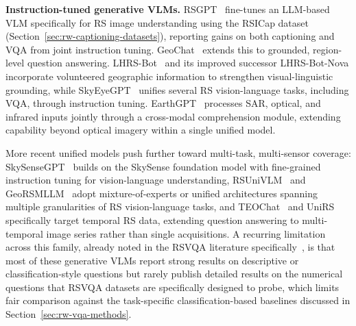 \textbf{Instruction-tuned generative VLMs.} RSGPT~\cite{hu2023rsgpt} fine-tunes an LLM-based VLM specifically for RS image understanding using the RSICap dataset (Section~\ref{sec:rw-captioning-datasets}), reporting gains on both captioning and VQA from joint instruction tuning. GeoChat~\cite{kuckreja2024geochat} extends this to grounded, region-level question answering. LHRS-Bot~\cite{muhtar2025lhrsbot} and its improved successor LHRS-Bot-Nova incorporate volunteered geographic information to strengthen visual-linguistic grounding, while SkyEyeGPT~\cite{zhan2025skyeyegpt} unifies several RS vision-language tasks, including VQA, through instruction tuning. EarthGPT~\cite{zhang2024earthgpt} processes SAR, optical, and infrared inputs jointly through a cross-modal comprehension module, extending capability beyond optical imagery within a single unified model.

More recent unified models push further toward multi-task, multi-sensor coverage: SkySenseGPT~\cite{luo2024skysensegptfinegrainedinstructiontuning} builds on the SkySense foundation model with fine-grained instruction tuning for vision-language understanding, RSUniVLM~\cite{liu2024rsunivlmunifiedvisionlanguage} and GeoRSMLLM~\cite{zhang2025georsmllmmultimodallargelanguage} adopt mixture-of-experts or unified architectures spanning multiple granularities of RS vision-language tasks, and TEOChat~\cite{irvin2025teochatlargevisionlanguageassistant} and UniRS~\cite{li2024unirsunifyingmultitemporalremote} specifically target temporal RS data, extending question answering to multi-temporal image series rather than single acquisitions. A recurring limitation across this family, already noted in the RSVQA literature specifically~\cite{boussaidtosato2025tour}, is that most of these generative VLMs report strong results on descriptive or classification-style questions but rarely publish detailed results on the numerical questions that RSVQA datasets are specifically designed to probe, which limits fair comparison against the task-specific classification-based baselines discussed in Section~\ref{sec:rw-vqa-methods}.

